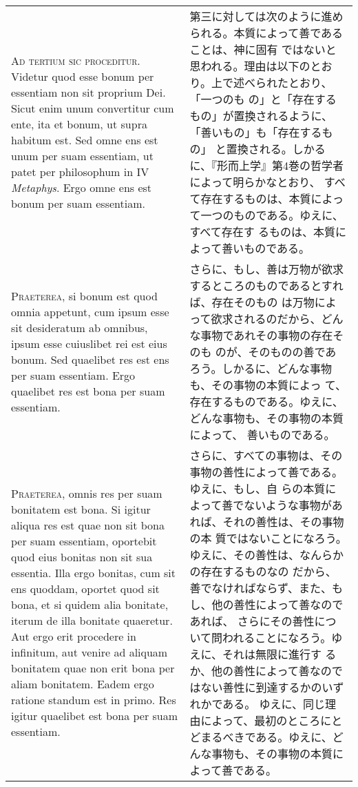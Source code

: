 \documentclass[10pt]{jsarticle} %
\begin{document}
\begin{longtable}{p{21em}p{21em}}

{\huge A}{\scshape d tertium sic proceditur}. Videtur quod esse bonum
per essentiam non sit proprium Dei. Sicut enim unum convertitur cum
ente, ita et bonum, ut supra habitum est. Sed omne ens est unum per suam
essentiam, ut patet per philosophum in IV {\itshape Metaphys}. Ergo omne
ens est bonum per suam essentiam.  &

第三に対しては次のように進められる。本質によって善であることは、神に固有
ではないと思われる。理由は以下のとおり。上で述べられたとおり、「一つのも
の」と「存在するもの」が置換されるように、「善いもの」も「存在するもの」
と置換される。しかるに、『形而上学』第4巻の哲学者によって明らかなとおり、
すべて存在するものは、本質によって一つのものである。ゆえに、すべて存在す
るものは、本質によって善いものである。

\\


{\scshape Praeterea}, si bonum est quod omnia appetunt, cum ipsum esse sit
desideratum ab omnibus, ipsum esse cuiuslibet rei est eius bonum. Sed
quaelibet res est ens per suam essentiam. Ergo quaelibet res est bona
per suam essentiam.

&

さらに、もし、善は万物が欲求するところのものであるとすれば、存在そのもの
 は万物によって欲求されるのだから、どんな事物であれその事物の存在そのも
 のが、そのものの善であろう。しかるに、どんな事物も、その事物の本質によっ
 て、存在するものである。ゆえに、どんな事物も、その事物の本質によって、
 善いものである。


\\

{\scshape Praeterea}, omnis res per suam bonitatem est bona. Si igitur
aliqua res est quae non sit bona per suam essentiam, oportebit quod eius
bonitas non sit sua essentia. Illa ergo bonitas, cum sit ens quoddam,
oportet quod sit bona, et si quidem alia bonitate, iterum de illa
bonitate quaeretur. Aut ergo erit procedere in infinitum, aut venire ad
aliquam bonitatem quae non erit bona per aliam bonitatem. Eadem ergo
ratione standum est in primo. Res igitur quaelibet est bona per suam
essentiam.

&

さらに、すべての事物は、その事物の善性によって善である。ゆえに、もし、自
 らの本質によって善でないような事物があれば、それの善性は、その事物の本
 質ではないことになろう。ゆえに、その善性は、なんらかの存在するものなの
 だから、善でなければならず、また、もし、他の善性によって善なのであれば、
 さらにその善性について問われることになろう。ゆえに、それは無限に進行す
 るか、他の善性によって善なのではない善性に到達するかのいずれかである。
 ゆえに、同じ理由によって、最初のところにとどまるべきである。ゆえに、ど
 んな事物も、その事物の本質によって善である。


\end{longtable}
\end{document}
